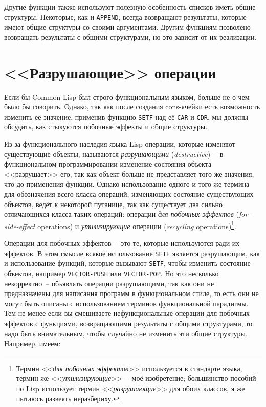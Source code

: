 Другие функции также используют полезную особенность списков иметь общие
структуры. Некоторые, как и \lstinline{APPEND}, всегда возвращают результаты, которые имеют
общие структуры со своими аргументами. Другим функциям позволено возвращать результаты с
общими структурами, но это зависит от их реализации.

\section{<<Разрушающие>> операции}

Если бы Common Lisp был строго функциональным языком, больше не о чем было бы
говорить. Однако, так как после создания cons-ячейки есть возможность изменить её значение,
применив функцию \lstinline{SETF} над её \lstinline{CAR} и \lstinline{CDR}, мы должны обсудить, как
стыкуются побочные эффекты и общие структуры.

Из-за функционального наследия языка Lisp операции, которые изменяют существующие объекты,
называются \textit{разрушающими} (\textit{destructive})~-- в функциональном программировании
изменение состояния объекта <<разрушает>> его, так как объект больше не представляет того же
значения, что до применения функции. Однако использование одного и того же термина для
обозначения всего класса операций, изменяющих состояние существующих объектов, ведёт к некоторой
путанице, так как существует два сильно отличающихся класса таких операций:
операции \textit{для побочных эффектов} (\textit{for-side-effect} operations) и
\textit{утилизирующие} операции (\textit{recycling} operations)\footnote{Термин <<\textit{для
  побочных эффектов}>> используется в стандарте языка, термин же <<\textit{утилизирующие}>>~--
  моё изобретение; большинство пособий по Lisp использует термин <<\textit{разрушающие}>> для
  обоих классов, я же пытаюсь развеять неразбериху.}.

Операции для побочных эффектов~-- это те, которые используются ради их эффектов. В этом
смысле всякое использование \lstinline{SETF} является разрушающим, как и использование
функций, которые вызывают \lstinline{SETF}, чтобы изменить состояние объектов, например
\lstinline{VECTOR-PUSH} или \lstinline{VECTOR-POP}. Но это несколько некорректно~-- объявлять операции
разрушающими, так как они не предназначены для написания программ в функциональном стиле,
то есть они не могут быть описаны с использованием терминов функциональной парадигмы. Тем не
менее если вы смешиваете нефункциональные операции для побочных эффектов с функциями,
возвращающими результаты с общими структурами, то надо быть внимательным, чтобы случайно
не изменить эти общие структуры. Например, имеем:

